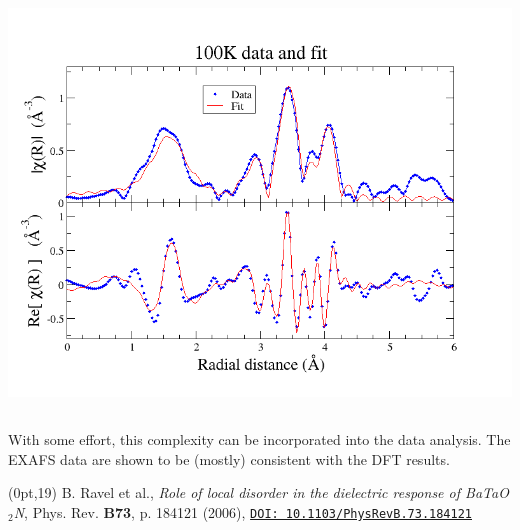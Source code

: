 \begin{frame}
\begin{columns}
\begin{column}{0.5\linewidth}
\begin{center}
        \includegraphics[width=\linewidth]{xas/bton_fit.png}
      \end{center}
    \end{column}
  \end{columns}
  With some effort, this complexity can be incorporated into the data
  analysis.  The EXAFS data are shown to be (mostly) consistent with
  the DFT results.

  \begin{textblock*}{0.5\linewidth}(0pt,19\TPVertModule) 
    \tiny
    B. Ravel et al., \textit{Role of local disorder in the dielectric
      response of BaTaO$_2$N}, Phys. Rev. \textbf{B73}, p. 184121 (2006), 
    \href{http://dx.doi.org/10.1103/PhysRevB.73.184121}
    {\color{Blue4}\texttt{DOI: 10.1103/PhysRevB.73.184121}}
  \end{textblock*}
\end{frame}
